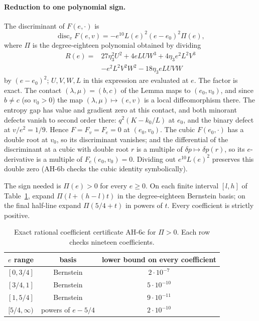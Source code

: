 \paragraph{Reduction to one polynomial sign.}
The discriminant of $F(e,\cdot)$ is
\begin{equation}\label{eq:seven-joint-discriminant}
 \operatorname{disc}_v F(e,v)
    =-e^{10}L(e)^2(e-e_0)^2\Pi(e),
\end{equation}
where $\Pi$ is the degree-eighteen polynomial obtained by dividing
\begin{equation}\label{eq:seven-joint-discriminant-polynomial}
\begin{split}
 R(e)={}&27\eta_3^2U^2+4eLUW^3+4\eta_3e^2L^2V^3\\
       &-e^2L^2V^2W^2-18\eta_3eLUVW
\end{split}
\end{equation}
by $(e-e_0)^2$; $U,V,W,L$ in this expression are evaluated at $e$.
The factor is exact. The contact $(\lambda,\mu)=(b,c)$ of the Lemma maps
to $(e_0,v_0)$, and since $b\ne c$ (so $v_0>0$) the map
$(\lambda,\mu)\mapsto(e,v)$ is a local diffeomorphism there. The entropy gap
has value and gradient zero at this contact, and both minorant defects vanish
to second order there: $q^2(K-k_0/L)$ at $e_0$, and the binary defect at
$v/e^2=1/9$. Hence $F=F_v=F_e=0$ at $(e_0,v_0)$. The cubic $F(e_0,\cdot)$
has a double root at $v_0$, so its discriminant vanishes; and the
differential of the discriminant at a cubic with double root $r$ is a
multiple of $\delta p\mapsto\delta p(r)$, so its $e$-derivative is a
multiple of $F_e(e_0,v_0)=0$. Dividing out $e^{10}L(e)^2$ preserves this
double zero (AH-6b checks the cubic identity symbolically).

The sign needed is $\Pi(e)>0$ for every $e\ge0$. On each finite interval $[l,h]$ of
Table~\ref{tab:seven-joint-discriminant}, expand $\Pi(l+(h-l)t)$ in the degree-eighteen Bernstein
basis; on the final half-line expand $\Pi(5/4+t)$ in powers of $t$. Every coefficient is strictly positive.

\begin{table}[htbp]
\centering
\begin{tabular}{ccc}
\toprule
$e$ range & basis & lower bound on every coefficient\\
\midrule
$[0,3/4]$ & Bernstein & $2\cdot10^{-7}$\\
$[3/4,1]$ & Bernstein & $5\cdot10^{-10}$\\
$[1,5/4]$ & Bernstein & $9\cdot10^{-11}$\\
$[5/4,\infty)$ & powers of $e-5/4$ & $2\cdot10^{-10}$\\
\bottomrule
\end{tabular}
\caption{Exact rational coefficient certificate AH-6c for $\Pi>0$.
Each row checks nineteen coefficients.}
\label{tab:seven-joint-discriminant}
\end{table}


